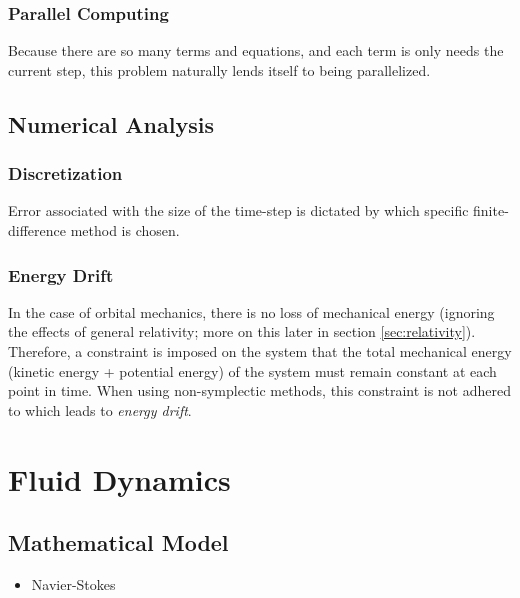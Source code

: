 \documentclass{report}
\begin{document}
            \subsubsection{Parallel Computing}

                Because there are so many terms and equations, and each term is only needs the current step, this problem naturally lends itself to being parallelized\cite{parallelnbody}.

        \subsection{Numerical Analysis}

            \subsubsection{Discretization}

                Error associated with the size of the time-step is dictated by which specific finite-difference method is chosen.

            \subsubsection{Energy Drift}

                In the case of orbital mechanics, there is no loss of mechanical energy (ignoring the effects of general relativity; more on this later in section \ref{sec:relativity}).  Therefore, a constraint is imposed on the system that the total mechanical energy (kinetic energy + potential energy) of the system must remain constant at each point in time.  When using non-symplectic methods, this constraint is not adhered to which leads to \emph{energy drift}.

\pagebreak

    \section{Fluid Dynamics}

        \subsection{Mathematical Model}

            \begin{itemize}
                \item Navier-Stokes
            \end{itemize}
\end{document}
